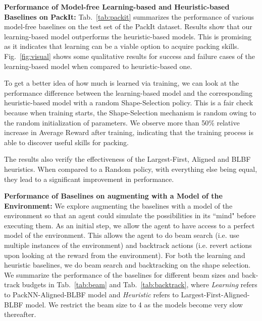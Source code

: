 \documentclass{article}
\begin{document}
\noindent\textbf{Performance of Model-free Learning-based and Heuristic-based Baselines on PackIt:} Tab.~\ref{tab:packit} summarizes the performance of various model-free baselines on the test set of the PackIt dataset. Results show that our learning-based model outperforms the heuristic-based models. This is promising as it indicates that learning can be a viable option to acquire packing skills. Fig.~\ref{fig:visual} shows some qualitative results for success and failure cases of the learning-based model when compared to heuristic-based one.

To get a better idea of how much is learned via training, we can look at the performance difference between the learning-based model and the corresponding heuristic-based model with a random Shape-Selection policy. This is a fair check because when training starts, the Shape-Selection mechanism is random owing to the random initialization of parameters. We observe more than 50\% relative increase in Average Reward after training, indicating that the training process is able to discover useful skills for packing.

The results also verify the effectiveness of the Largest-First, Aligned and BLBF heuristics. When compared to a Random policy, with everything else being equal, they lead to a significant improvement in performance. 

\noindent\textbf{Performance of Baselines on augmenting with a Model of the Environment:} We explore augmenting the baselines with a model of the environment so that an agent could simulate the possibilities in its ``mind" before executing them. As an initial step, we allow the agent to have access to a perfect model of the environment.  This allows the agent to do beam search (i.e. use multiple instances of the environment) and backtrack actions (i.e. revert actions upon looking at the reward from the environment). For both the learning and heuristic baselines, we do beam search and backtracking on the shape selection. We summarize the performance of the baselines for different beam sizes and back-track budgets in Tab.~\ref{tab:beam} and Tab.~\ref{tab:backtrack}, where \textit{Learning} refers to PackNN-Aligned-BLBF model and \textit{Heuristic} refers to Largest-First-Aligned-BLBF model. We restrict the beam size to 4 as the models become very slow thereafter. 
\end{document}
